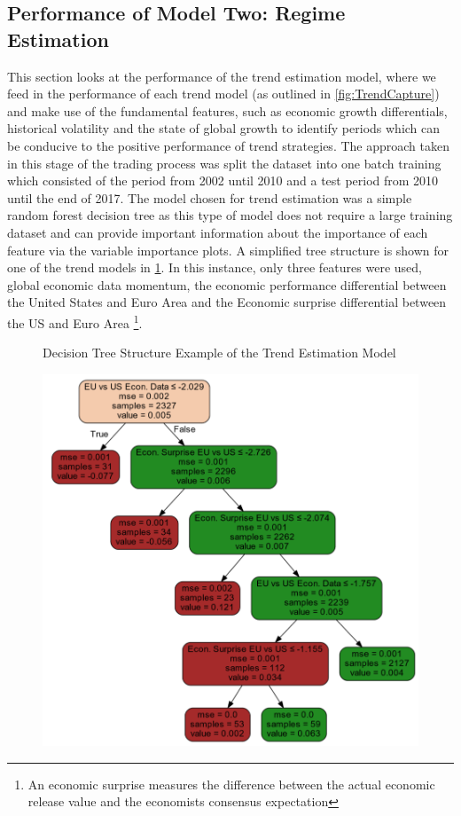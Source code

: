 \documentclass[11pt]{article}
\begin{document}
\subsection{Performance of Model Two: Regime Estimation}
This section looks at the performance of the trend estimation model, where we feed in the performance of each trend model (as outlined in \ref{fig:TrendCapture}) and make use of the fundamental features, such as economic growth differentials, historical volatility and the state of global growth to identify periods which can be conducive to the positive performance of trend strategies. The approach taken in this stage of the trading process was split the dataset into one batch training which consisted of the period from 2002 until 2010 and a test period from 2010 until the end of 2017. The model chosen for trend estimation was a simple random forest decision tree as this type of model does not require a large training dataset and can provide important information about the importance of each feature via the variable importance plots. A simplified tree structure is shown for one of the trend models in \ref{fig:decision_tree_model}. In this instance, only three features were used, global economic data momentum, the economic performance differential between the United States and Euro Area and the Economic surprise differential between the US and Euro Area \footnote{An economic surprise measures the difference between the actual economic release value and the economists consensus expectation}.
\begin{figure}[h]
    \centering
	\caption{Decision Tree Structure Example of the Trend Estimation Model}    
	\includegraphics[width=1\textwidth]{decision_tree_model}
    \label{fig:decision_tree_model}
     \caption*{}
\end{figure}
\end{document}
